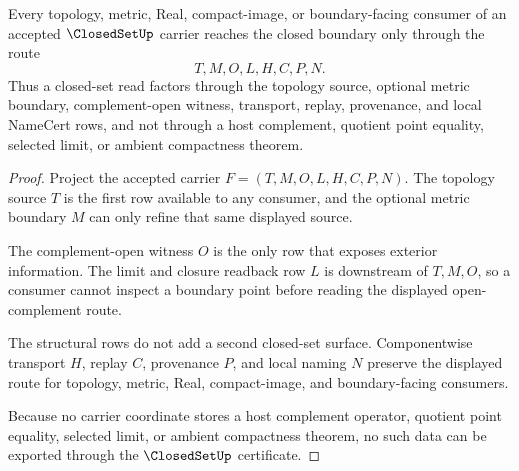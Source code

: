 \begin{theorem}
\label{thm:closed-set-complement-open-route}
Every topology, metric, Real, compact-image, or boundary-facing consumer of an accepted $\ClosedSetUp$ carrier reaches the closed boundary only through the route
$$
T,M,O,L,H,C,P,N .
$$
Thus a closed-set read factors through the topology source, optional metric boundary, complement-open witness, transport, replay, provenance, and local NameCert rows, and not through a host complement, quotient point equality, selected limit, or ambient compactness theorem.
\end{theorem}
\begin{proof}
Project the accepted carrier $F=(T,M,O,L,H,C,P,N)$. The topology source $T$ is the first row available to any consumer, and the optional metric boundary $M$ can only refine that same displayed source.

The complement-open witness $O$ is the only row that exposes exterior information. The limit and closure readback row $L$ is downstream of $T,M,O$, so a consumer cannot inspect a boundary point before reading the displayed open-complement route.

The structural rows do not add a second closed-set surface. Componentwise transport $H$, replay $C$, provenance $P$, and local naming $N$ preserve the displayed route for topology, metric, Real, compact-image, and boundary-facing consumers.

Because no carrier coordinate stores a host complement operator, quotient point equality, selected limit, or ambient compactness theorem, no such data can be exported through the $\ClosedSetUp$ certificate.
\end{proof}
